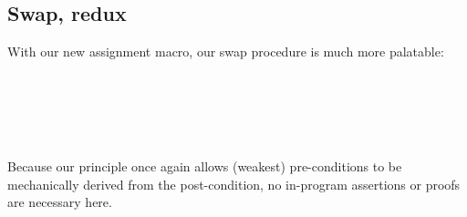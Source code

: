 \documentclass[sigplan]{acmart}%
\begin{document}
\subsection{Swap, redux}
With our new assignment macro, our swap procedure is much more 
palatable:
\begin{code}
\>[2]\AgdaSpace{}%
\AgdaSymbol{:}\AgdaSpace{}%
\AgdaSpace{}%
\AgdaSpace{}%
\AgdaSymbol{:}\AgdaSpace{}%
\AgdaSymbol{\}}\AgdaSpace{}%
\AgdaSpace{}%
\AgdaOperator{\AgdaDatatype{[}}\AgdaSpace{}%
\AgdaSpace{}%
\AgdaSpace{}%
\AgdaSpace{}%
\AgdaSpace{}%
\AgdaSpace{}%
\AgdaSpace{}%
\AgdaSpace{}%
\AgdaOperator{\AgdaDatatype{,}}\AgdaSpace{}%
\AgdaSpace{}%
\AgdaSpace{}%
\AgdaSpace{}%
\AgdaSpace{}%
\AgdaSpace{}%
\AgdaSpace{}%
\AgdaSpace{}%
\AgdaOperator{\AgdaDatatype{]}}\<%
\\
%
\>[2]\AgdaSpace{}%
\AgdaSymbol{=}%
\>[2090I]\<%
\\
\>[2090I][@{}l@{\AgdaIndent{0}}]%
\>[16]\AgdaSpace{}%
\AgdaSpace{}%
\AgdaSpace{}%
\AgdaSpace{}%
\AgdaSpace{}%
\AgdaSpace{}%
\AgdaSpace{}%
\AgdaSpace{}%
\AgdaSpace{}%
\AgdaSpace{}%
\<%
\\
\>[.][@{}l@{}]\<[2090I]%
\>[12]\AgdaSpace{}%
\AgdaInductiveConstructor{[]}\<%
\\
%
\>[12]\<%
\end{code}
Because our  principle once again allows 
(weakest) pre-conditions to be mechanically derived from the 
post-condition, no in-program assertions or proofs are necessary
here.
\end{document}
